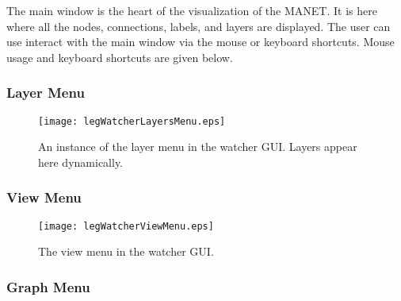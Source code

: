 The main window is the heart of the visualization of the MANET. It is here where all the nodes, connections, labels, and layers are displayed. The 
user can use interact with the main window via the mouse or keyboard shortcuts. Mouse usage and keyboard shortcuts are given below.

\subsubsection{Layer Menu}
\begin{figure}[htb]
\centering
\texttt{[image: legWatcherLayersMenu.eps]}
\caption{An instance of the layer menu in the watcher GUI. Layers appear here dynamically.}
\label{fig:legWatcherLayersMenu}
\end{figure}

\subsubsection{View Menu}
\begin{figure}[htb]
\centering
\texttt{[image: legWatcherViewMenu.eps]}
\caption{The view menu in the watcher GUI.}
\label{fig:legWatcherViewMenu}
\end{figure}

\subsubsection{Graph Menu}



